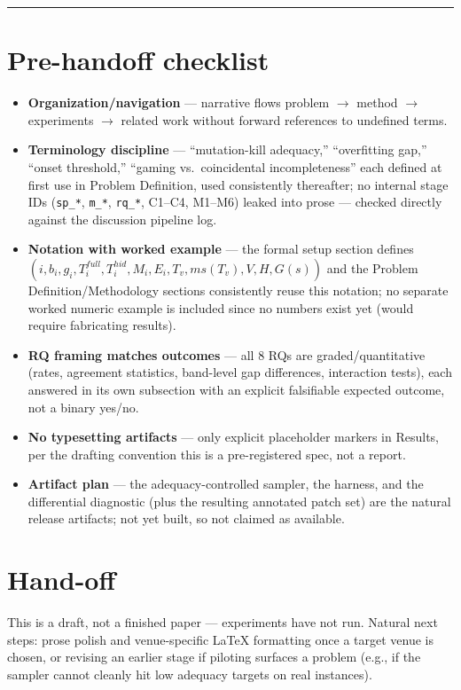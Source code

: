 \documentclass[11pt]{article}
\begin{document}
\vspace{1em}
\hrule
\vspace{1em}

\section*{Pre-handoff checklist}
\begin{itemize}[leftmargin=1.4em]
\item \textbf{Organization/navigation} --- narrative flows problem $\to$ method $\to$ experiments $\to$ related work without forward references to undefined terms.
\item \textbf{Terminology discipline} --- ``mutation-kill adequacy,'' ``overfitting gap,'' ``onset threshold,'' ``gaming vs.\ coincidental incompleteness'' each defined at first use in Problem Definition, used consistently thereafter; no internal stage IDs (\texttt{sp\_*}, \texttt{m\_*}, \texttt{rq\_*}, C1--C4, M1--M6) leaked into prose --- checked directly against the discussion pipeline log.
\item \textbf{Notation with worked example} --- the formal setup section defines $(i, b_i, g_i, T_i^{full}, T_i^{hid}, M_i, E_i, T_v, ms(T_v), V, H, G(s))$ and the Problem Definition/Methodology sections consistently reuse this notation; no separate worked numeric example is included since no numbers exist yet (would require fabricating results).
\item \textbf{RQ framing matches outcomes} --- all 8 RQs are graded/quantitative (rates, agreement statistics, band-level gap differences, interaction tests), each answered in its own subsection with an explicit falsifiable expected outcome, not a binary yes/no.
\item \textbf{No typesetting artifacts} --- only explicit placeholder markers in Results, per the drafting convention this is a pre-registered spec, not a report.
\item \textbf{Artifact plan} --- the adequacy-controlled sampler, the harness, and the differential diagnostic (plus the resulting annotated patch set) are the natural release artifacts; not yet built, so not claimed as available.
\end{itemize}

\section*{Hand-off}
This is a draft, not a finished paper --- experiments have not run. Natural next steps: prose polish and venue-specific LaTeX formatting once a target venue is chosen, or revising an earlier stage if piloting surfaces a problem (e.g., if the sampler cannot cleanly hit low adequacy targets on real instances).



\end{document}
